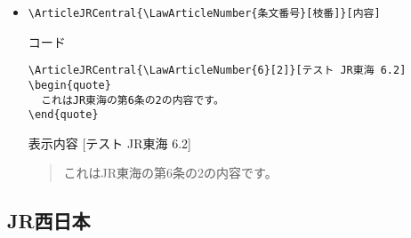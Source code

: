 \documentclass[oneside,10pt,a4paper]{jsarticle}
\begin{document}
\begin{itemize}
\begin{itembox}[l]{表示内容}
\begin{quote}
          これはJR東海の第6条の内容です。
        \end{quote}
      \end{itembox}
    \item \verb|\ArticleJRCentral{\LawArticleNumber{条文番号}[枝番]}[内容]|
      \begin{itembox}[l]{コード}
        {\footnotesize\begin{verbatim}
\ArticleJRCentral{\LawArticleNumber{6}[2]}[テスト JR東海 6.2]
\begin{quote}
  これはJR東海の第6条の2の内容です。
\end{quote}\end{verbatim}}
      \end{itembox}
      \begin{itembox}[l]{表示内容}
        [テスト JR東海 6.2]
        \begin{quote}
          これはJR東海の第6条の2の内容です。
        \end{quote}
      \end{itembox}
  \end{itemize}

  \newpage

  \subsection{JR西日本}
\end{document}
